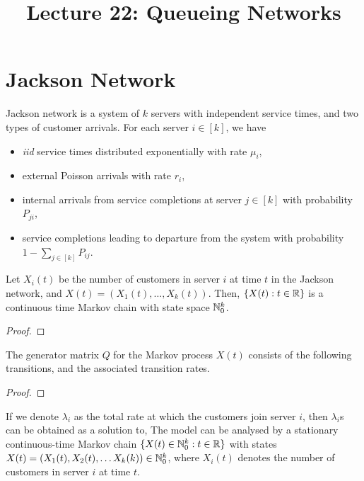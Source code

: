 \documentclass[a4paper,10pt,english]{article}
\title{Lecture 22: Queueing Networks}
\author{}
\begin{document}
\maketitle

\section{Jackson Network}
Jackson network is a system of $k$ servers with independent service times, and two types of customer arrivals. 
For each server $i \in [k]$, we have
\begin{itemize}
	\item \textit{iid} service times distributed exponentially with rate $\mu_i$,
	\item external Poisson arrivals with rate $r_i$,
	\item internal arrivals from service completions at server $j \in [k]$ with probability $P_{ji}$,
	\item service completions leading to departure from the system with probability $1-\sum_{j \in [k]}P_{ij}$. 
\end{itemize}  
\begin{lem} 
Let $X_i(t)$ be the number of customers in server $i$ at time $t$ in the Jackson network, 
and $X(t) = (X_1(t), \dots, X_k(t))$. 
Then, $\{X(t): t \in \mathbb{R}\}$ is a continuous time Markov chain with state space $\mathbb{N}_0^k$. 
\end{lem}
\begin{proof}

\end{proof}
\begin{lem} 
The generator matrix $Q$ for the Markov process $X(t)$ consists of the following transitions, 
and the associated transition rates. 
\end{lem}
\begin{proof}
\end{proof}
If we denote $\lambda_i$ as the total rate at which the customers join server $i$, 
then $\lambda_i$s can be obtained as a solution to,
The model can be analysed by a stationary continuous-time Markov chain $\{X(t) \in \mathbb{N}_0^k: t \in \mathbb{R}\}$ with states $X(t) = (X_1(t),X_2(t), \dots X_k(k)) \in \mathbb{N}_0^k$, 
where $X_i(t)$ denotes the number of customers in server $i$ at time $t$. 
\end{document}
